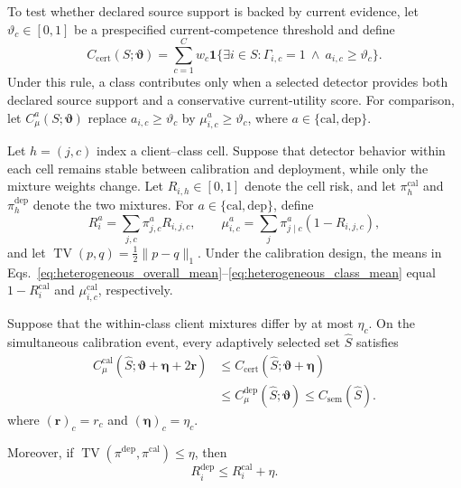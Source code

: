 To test whether declared source support is backed by current evidence, let
$\vartheta_c\in[0,1]$ be a prespecified current-competence threshold and define
\begin{equation}
C_{\mathrm{cert}}(S;\boldsymbol\vartheta)=
\sum_{c=1}^{C}w_c
\mathbf 1\{\exists i\in S:
\Gamma_{i,c}=1\ \wedge\ a_{i,c}\ge\vartheta_c\}.
\label{eq:certified_coverage}
\end{equation}
Under this rule, a class contributes only when a selected detector provides
both declared source support and a conservative current-utility score.
For comparison, let $C_\mu^a(S;\boldsymbol\vartheta)$ replace
$a_{i,c}\ge\vartheta_c$ by
$\mu_{i,c}^a\ge\vartheta_c$, where
$a\in\{\mathrm{cal},\mathrm{dep}\}$.

Let $h=(j,c)$ index a client--class cell. Suppose that detector behavior
within each cell remains stable between calibration and deployment, while
only the mixture weights change. Let $R_{i,h}\in[0,1]$ denote the cell risk,
and let $\pi_h^{\mathrm{cal}}$ and $\pi_h^{\mathrm{dep}}$ denote the two
mixtures. For $a\in\{\mathrm{cal},\mathrm{dep}\}$, define
\begin{equation}
R_i^a=\sum_{j,c}\pi_{j,c}^a R_{i,j,c},
\qquad
\mu_{i,c}^a=\sum_j\pi_{j\mid c}^a(1-R_{i,j,c}),
\label{eq:mixture_quantities}
\end{equation}
and let $\operatorname{TV}(p,q)=\tfrac12\lVert p-q\rVert_1$. Under the
calibration design, the means in
Eqs.~\ref{eq:heterogeneous_overall_mean}--\ref{eq:heterogeneous_class_mean}
equal $1-R_i^{\mathrm{cal}}$ and $\mu_{i,c}^{\mathrm{cal}}$, respectively.

\begin{theorem}
\label{thm:post_selection_certificates}
Suppose that the within-class client mixtures differ by at most $\eta_c$.
On the simultaneous calibration event, every adaptively selected set
$\widehat S$ satisfies
\begin{equation}
\begin{aligned}
C_\mu^{\mathrm{cal}}(\widehat S;
\boldsymbol\vartheta+\boldsymbol\eta+2\boldsymbol r)
&\le C_{\mathrm{cert}}(\widehat S;
\boldsymbol\vartheta+\boldsymbol\eta)
\\
&\le C_\mu^{\mathrm{dep}}(\widehat S;\boldsymbol\vartheta)
\le C_{\mathrm{sem}}(\widehat S).
\end{aligned}
\label{eq:certified_coverage_sandwich}
\end{equation}
where $(\boldsymbol r)_c=r_c$ and
$(\boldsymbol\eta)_c=\eta_c$.

Moreover, if
$\operatorname{TV}(\pi^{\mathrm{dep}},\pi^{\mathrm{cal}})\le\eta$, then
\begin{equation}
R_i^{\mathrm{dep}}\le R_i^{\mathrm{cal}}+\eta.
\label{eq:risk_mixture_shift}
\end{equation}
\end{theorem}

